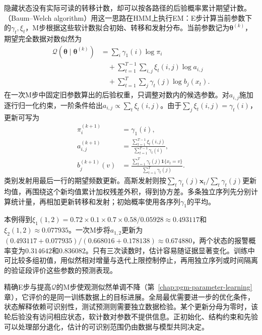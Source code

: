 隐藏状态没有实际可读的转移计数，却可以按各路径的后验概率累计期望计数。（Baum--Welch algorithm）用这一思路在HMM上执行EM：E步计算当前参数下的$\gamma_t,\xi_t$，M步根据这些软计数拟合初始、转移和发射分布。当前参数记为$\bm{\theta}^{(k)}$，期望完全数据对数似然为
\begin{equation}
  \begin{aligned}
    \mathcal{Q}(\bm{\theta}\mid\bm{\theta}^{(k)})
      &=\sum_i\gamma_1(i)\log\pi_i\\
      &\quad{}+\sum_{t=1}^{T-1}\sum_{i,j}
        \xi_t(i,j)\log a_{i,j}\\
      &\quad{}+\sum_{t=1}^{T}\sum_j
        \gamma_t(j)\log b_j(x_t).
  \end{aligned}
  \label{eq:pgm-dynamic-hmm-em-objective}
\end{equation}
在一次M步中固定旧参数算出的后验权重，只调整对数内的候选参数。对$a_{i,j}$施加逐行归一化约束，一阶条件给出$a_{i,j}\propto\sum_t\xi_t(i,j)$。由于$\sum_j\xi_t(i,j)=\gamma_t(i)$，更新可写为
\begin{equation}
  \begin{aligned}
    \pi_i^{(k+1)}&=\gamma_1(i),\\
    a_{i,j}^{(k+1)}
      &=\frac{\sum_{t=1}^{T-1}\xi_t(i,j)}
        {\sum_{t=1}^{T-1}\gamma_t(i)},\\
    b_j^{(k+1)}(v)
      &=\frac{\sum_{t=1}^{T}
        \gamma_t(j)\mathbf{1}\{x_t=v\}}
        {\sum_{t=1}^{T}\gamma_t(j)}.
  \end{aligned}
  \label{eq:pgm-dynamic-baum-welch}
\end{equation}
类别发射用最后一行的期望频数更新。高斯发射则按$\sum_t\gamma_t(j)\bm{x}_t/\sum_t\gamma_t(j)$更新均值，再围绕这个新均值累计加权残差外积，得到协方差。多条独立序列先分别计算统计量，再相加更新转移和发射；初始概率使用各序列$\gamma_1$的平均。

本例得到$\xi_1(1,2)=0.72\times0.1\times0.7\times0.58/0.05928\approx0.493117$和$\xi_2(1,2)\approx0.077935$。一次M步将$a_{1,2}$更新为$(0.493117+0.077935)/(0.668016+0.178138)\approx0.674880$，两个状态的报警概率变为$0.314642$和$0.836082$。只有三次读数时，估计容易随证据显著变化。训练中可比较多组初值，用似然相对增量与迭代上限控制停止，再用独立序列或时间隔离的验证段评价这些参数的预测表现。

精确E步与提高$\mathcal Q$的M步使观测似然单调不降（第~\ref{chap:pgm-parameter-learning}章），它评价的是同一训练数据上的目标进展。全局最优需要进一步的优化条件，状态解释依赖可识别性，测试预测则需要独立数据检验。某个更新分母为零时，该轮后验没有访问相应状态，软计数对参数不提供信息。正初始化、结构约束和先验可以处理部分退化，估计的可识别范围仍由数据与模型共同决定。

